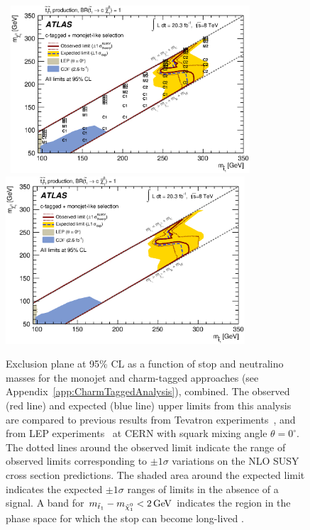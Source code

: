 \begin{figure}[!ht]
\begin{center}
\mbox{
\includegraphics[width=0.795\textwidth]{Interpretations/Figures/limitPlotStop_Stop_combined_M1_M2_M3_C1_C2_BestRegion.eps}
}
\mbox{
\includegraphics[width=0.795\textwidth]{Appendix_CharmTagged/Figures/limitPlotStop_Stop_combined_M1_M2_M3_C1_C2_.eps}
}
\end{center}
\caption[Exclusion plane at 95\% CL for stop pair production with $\stoptocharm$ as a function of the $m_{\stop}$ and $m_{\ninoone}$, combining the monojet and the charm-tagged approaches]{Exclusion plane at 95\% CL as a function of stop and neutralino masses for the monojet and charm-tagged approaches (see Appendix~\ref{app:CharmTaggedAnalysis}), combined. The observed (red line) and expected (blue line) upper limits from this analysis are compared to previous results from Tevatron experiments~\cite{Abazov:2008rc}, and from LEP experiments~\cite{Aaltonen:2012tq} at CERN with squark mixing angle $\theta=0^{\circ}$. The dotted lines around the observed limit indicate the range of observed limits corresponding to $\pm 1 \sigma$ variations on the NLO SUSY cross section predictions. The shaded area around the expected limit indicates the expected $\pm 1 \sigma$ ranges of limits in the absence of a signal. A band for $m_{\stopone} - m_{\ninoone}< \unit[2]{GeV}$ indicates the region in the phase space for which the stop can become long-lived \protect\cite{Aad:2014nra}.}
\label{fig:ExclusionStoptocharmCombinedAll}
\end{figure}


